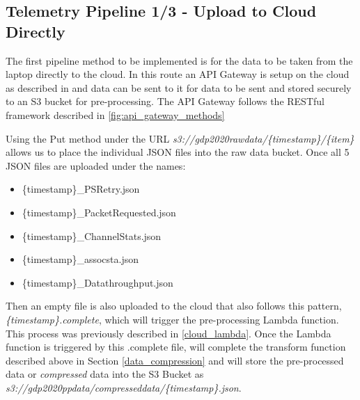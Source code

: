 \subsection{Telemetry Pipeline 1/3 - Upload to Cloud Directly}
The first pipeline method to be implemented is for the data to be taken from the laptop directly to the cloud. In this route an API Gateway is setup on the cloud as described in %
and data can be sent to it for data to be sent and stored securely to an S3 bucket for pre-processing. The API Gateway follows the RESTful framework described in \ref{fig:api_gateway_methods}



Using the Put method under the URL \textit{s3://gdp2020rawdata/\{timestamp\}/\{item\}} allows us to place the individual JSON files into the raw data bucket. Once all 5 JSON files are uploaded under the names:
\begin{itemize}
    \item \{timestamp\}\_PSRetry.json
    \item \{timestamp\}\_PacketRequested.json
    \item \{timestamp\}\_ChannelStats.json
    \item \{timestamp\}\_assocsta.json
    \item \{timestamp\}\_Datathroughput.json
\end{itemize}
Then an empty file is also uploaded to the cloud that also follows this pattern,\\ 
\textit{\{timestamp\}.complete}, which will trigger the pre-processing Lambda function. This process was previously described in \ref{cloud_lambda}. Once the Lambda function is triggered by this .complete file, will complete the transform function described above in Section \ref{data_compression} and will store the pre-processed data or \textit{compressed} data into the S3 Bucket as \\\textit{s3://gdp2020ppdata/compresseddata/\{timestamp\}.json}.

